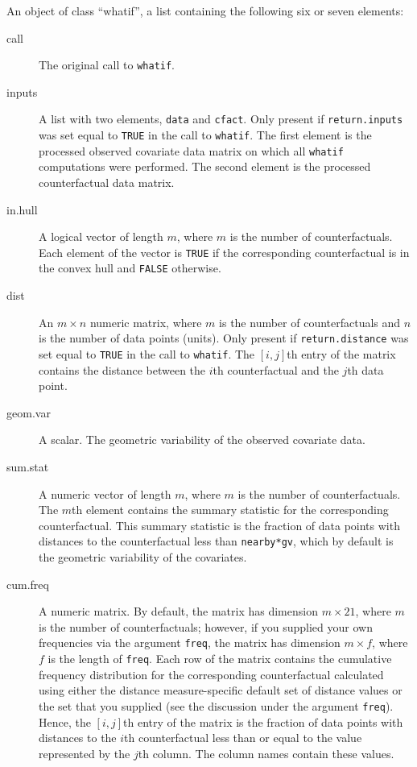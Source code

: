 \documentclass[oneside,letterpaper,titlepage]{article}
\begin{document}
An object of class ``whatif'', a list containing the following six or
seven elements:
\begin{description}
\item[call]  The original call to \texttt{whatif}.
\item[inputs] A list with two elements, \texttt{data} and \texttt{cfact}.  Only
  present if \texttt{return.inputs} was set equal to \texttt{TRUE} in the call
  to \texttt{whatif}.  The first element is the processed observed
  covariate data matrix on which all \texttt{whatif} computations were
  performed.  The second element is the processed counterfactual data
  matrix.
\item[in.hull] A logical vector of length $m$, where $m$ is
  the number of counterfactuals.  Each element of the vector is \texttt{TRUE}
  if the corresponding counterfactual is in the convex hull and \texttt{FALSE}
  otherwise.
\item[dist] An $m \times n$ numeric matrix, where $m$ is the number of
  counterfactuals and $n$ is the number of data points (units).  Only
  present if \texttt{return.distance} was set equal to \texttt{TRUE}
  in the call to \texttt{whatif}.  The $[i,j]$th entry of the matrix
  contains the distance between the $i$th counterfactual and the $j$th
  data point.
\item[geom.var]  A scalar.  The geometric variability of the observed
  covariate data.
\item[sum.stat] A numeric vector of length $m$, where $m$ is the
  number of counterfactuals.  The $m$th element contains the summary
  statistic for the corresponding counterfactual.  This summary
  statistic is the fraction of data points with distances to the
  counterfactual less than \texttt{nearby*gv}, which by
  default is the geometric variability of the covariates.
\item[cum.freq] A numeric matrix.  By default, the matrix has
  dimension $m \times 21$, where $m$ is the number of counterfactuals;
  however, if you supplied your own frequencies via the argument
  \texttt{freq}, the matrix has dimension $m \times f$, where $f$ is the
  length of \texttt{freq}.  Each row of the matrix contains the
  cumulative frequency distribution for the corresponding
  counterfactual calculated using either the distance measure-specific
  default set of distance values or the set that you supplied (see the
  discussion under the argument \texttt{freq}).  Hence, the $[i,j]$th
  entry of the matrix is the fraction of data points with 
  distances to the $i$th counterfactual less than or equal to the
  value represented by the $j$th column.  The column names contain these
  values.
\end{description}
\end{document}
